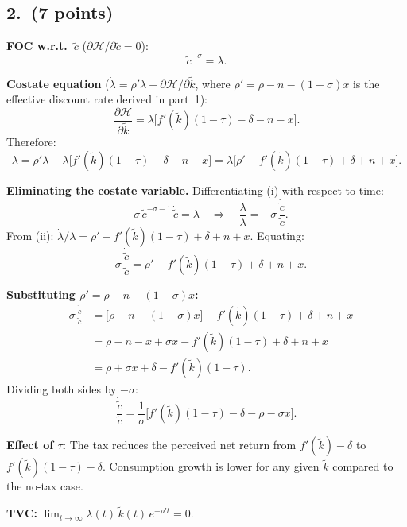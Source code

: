 \documentclass[a4paper,11pt]{article}
\newcommand{\ktilde}{\tilde{k}}
\newcommand{\ctilde}{\tilde{c}}
\begin{document}
\subsection*{2.\ (7 points)}

\begin{answerbox}
\textbf{FOC w.r.t.\ $\ctilde$} ($\partial\mathcal{H}/\partial\ctilde = 0$):
\[
    \ctilde^{-\sigma} = \lambda. \tag{i}
\]

\textbf{Costate equation} ($\dot{\lambda} = \rho'\lambda - \partial\mathcal{H}/\partial\ktilde$,
where $\rho' = \rho - n - (1-\sigma)x$ is the effective discount rate derived in part~1):
\[
    \frac{\partial\mathcal{H}}{\partial\ktilde}
    = \lambda\bigl[f'(\ktilde)(1-\tau) - \delta - n - x\bigr].
\]
Therefore:
\[
    \dot{\lambda} = \rho'\lambda - \lambda\bigl[f'(\ktilde)(1-\tau) - \delta - n - x\bigr]
    = \lambda\bigl[\rho' - f'(\ktilde)(1-\tau) + \delta + n + x\bigr].
    \tag{ii}
\]

\textbf{Eliminating the costate variable.} Differentiating (i) with respect to time:
\[
    -\sigma\,\ctilde^{-\sigma-1}\,\dot{\ctilde} = \dot{\lambda}
    \quad\Longrightarrow\quad
    \frac{\dot{\lambda}}{\lambda} = -\sigma\,\frac{\dot{\ctilde}}{\ctilde}.
\]
From (ii): $\dot{\lambda}/\lambda = \rho' - f'(\ktilde)(1-\tau) + \delta + n + x$.  Equating:
\[
    -\sigma\,\frac{\dot{\ctilde}}{\ctilde} = \rho' - f'(\ktilde)(1-\tau) + \delta + n + x.
\]

\textbf{Substituting $\rho' = \rho - n - (1-\sigma)x$:}
\begin{align*}
    -\sigma\,\frac{\dot{\ctilde}}{\ctilde}
    &= \bigl[\rho - n - (1-\sigma)x\bigr] - f'(\ktilde)(1-\tau) + \delta + n + x \\
    &= \rho - n - x + \sigma x - f'(\ktilde)(1-\tau) + \delta + n + x \\
    &= \rho + \sigma x + \delta - f'(\ktilde)(1-\tau).
\end{align*}
Dividing both sides by $-\sigma$:
\[
    \boxed{\frac{\dot{\ctilde}}{\ctilde}
    = \frac{1}{\sigma}\bigl[f'(\ktilde)(1-\tau) - \delta - \rho - \sigma x\bigr].}
\]

\textbf{Effect of $\tau$:} The tax reduces the perceived net return from $f'(\ktilde)-\delta$
to $f'(\ktilde)(1-\tau)-\delta$.  Consumption growth is lower for any given $\ktilde$
compared to the no-tax case.

\textbf{TVC:} $\displaystyle\lim_{t\to\infty}\lambda(t)\,\ktilde(t)\,e^{-\rho' t} = 0$.
\end{answerbox}
\end{document}
